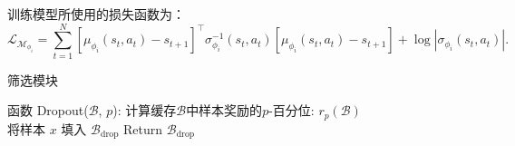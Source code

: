 训练模型所使用的损失函数为：
\begin{equation}
    \mathcal{L}_{\mathcal{M}_{\phi_i}} = \sum_{t=1}^N[\mu_{\phi_i}(s_t,a_t)-s_{t+1}]^\top\sigma_{\phi_i}^{-1}(s_t,a_t)
    [\mu_{\phi_i}(s_t,a_t)-s_{t+1}] + \log|\sigma_{\phi_i}(s_t,a_t)|.
\end{equation}

\begin{algorithm}[ht]
\caption{筛选模块}
\begin{algorithmic}
\STATE 函数 Dropout($\mathcal{B}$, $p$):
    \STATE 计算缓存$\mathcal{B}$中样本奖励的$p$-百分位: $r_p(\mathcal{B})$\\
            \STATE 将样本 $x$ 填入 $\mathcal{B}_{\mathrm{drop}}$
        \ENDIF
    \ENDFOR
    \STATE Return $\mathcal{B}_{\mathrm{drop}}$
\end{algorithmic}\label{algo:dropout-algo}
\end{algorithm}

